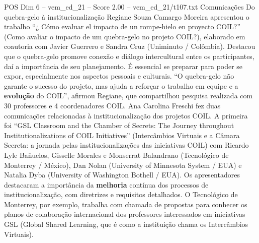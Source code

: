 \begin{textsample}{POS Dim 6 – vem\_ed\_21 – Score 2.00 – vem\_ed\_21/t107.txt}  \label{ex:f6_pos_122}
Comunicações Do quebra-gelo à institucionalização Regiane Souza Camargo Moreira apresentou o trabalho “¿ Cómo evaluar el impacto de un rompe-hielo en proyecto COIL?” (Como avaliar o impacto de um quebra-gelo no projeto COIL?), elaborado em coautoria com Javier Guerrero e Sandra Cruz (Uniminuto / Colômbia).
Destacou que o quebra-gelo promove conexão e diálogo intercultural entre os participantes, daí a importância de seu planejamento.
É essencial se preparar para poder se expor, especialmente nos aspectos pessoais e culturais. “O quebra-gelo não garante o sucesso do projeto, mas ajuda a reforçar o trabalho em equipe e a \textbf{evolução} do COIL”, afirmou Regiane, que compartilhou pesquisa realizada com 30 professores e 4 coordenadores COIL.
Ana Carolina Freschi fez duas comunicações relacionadas à institucionalização dos projetos COIL.
A primeira foi “GSL Classroom and the Chamber of Secrets: The Journey throughout Institutionalizations of COIL Initiatives” (Intercâmbios Virtuais e a Câmara Secreta: a jornada pelas institucionalizações das iniciativas COIL) com Ricardo Lyle Bañuelos, Gisselle Morales e Monserrat Balandrano (Tecnológico de Monterrey / México), Dan Nolan (University of Minnesota System / EUA) e Natalia Dyba (University of Washington Bothell / EUA).
Os apresentadores destacaram a importância da \textbf{melhoria} contínua dos processos de institucionalização, com diretrizes e requisitos detalhados.
O Tecnológico de Monterrey, por exemplo, trabalha com chamada de propostas para conhecer os planos de colaboração internacional dos professores interessados em iniciativas GSL (Global Shared Learning, que é como a instituição chama os Intercâmbios Virtuais).

\end{textsample}
